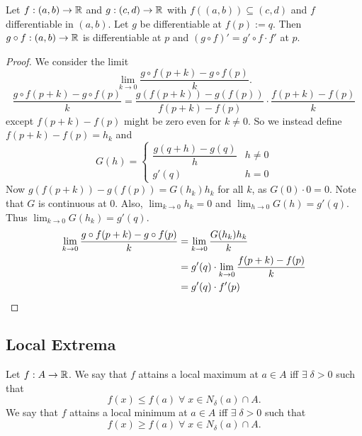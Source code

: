 
\begin{thm} \label{thm:diff:chain_rule}
    Let $f: (a, b) \to \mathbb{R}$ and $g : (c, d) \to \mathbb{R}$ with $f((a, b)) \subseteq (c, d)$ and $f$ differentiable in $(a, b)$. Let $g$ be differentiable at $f(p) := q$. Then $g \circ f : (a, b) \to \mathbb{R}$ is differentiable at $p$ and $(g \circ f)' = g' \circ f \cdot f'$ at $p$.
\end{thm}

\begin{proof}
    We consider the limit \[
        \lim_{k \to 0} \frac{g \circ f (p + k) - g \circ f (p)}{k}.
    \] \[
        \frac{g \circ f (p + k) - g \circ f (p)}{k} = \frac{g(f(p + k)) - g(f(p))}{f(p + k) - f(p)} \cdot \frac{f(p + k) - f(p)}{k}
    \] except $f(p + k) - f(p)$ might be zero even for $k \neq 0$. So we instead define $f(p + k) - f(p) = h_{k}$ and \[
        G(h) =
        \begin{cases}
            \dfrac{g(q + h) - g(q)}{h} & h \neq 0 \\
            g'(q) & h = 0
        \end{cases}
    \]
    Now $g(f(p + k)) - g(f(p)) = G(h_{k}) h_{k}$ for all $k$, as $G(0) \cdot 0 = 0$. Note that $G$ is continuous at $0$. Also, $\lim_{k \to 0} h_{k} = 0$ and $\lim_{h \to 0} G(h) = g'(q)$. Thus $\lim_{k \to 0} G(h_{k}) = g'(q)$.
    \begin{align*}
        \lim_{k \to 0} \frac{g \circ f (p + k) - g \circ f (p)}{k} &= \lim_{k \to 0} \frac{G(h_{k}) h_{k}}{k} \\
        &= g'(q) \cdot \lim_{k \to 0} \frac{f(p + k) - f(p)}{k} \\
        &= g'(q) \cdot f'(p) \qedhere
    \end{align*}
\end{proof}

\subsection{Local Extrema}
\begin{defn} \label{defn:diff:local_extrema}
    Let $f : A \to \mathbb{R}$. We say that $f$ attains a local maximum at $a \in A$ iff $\exists\; \delta > 0$ such that \[
        f(x) \leq f(a) \;\forall\; x \in N_{\delta}(a) \cap A.
    \] We say that $f$ attains a local minimum at $a \in A$ iff $\exists\; \delta > 0$ such that \[
        f(x) \geq f(a) \;\forall\; x \in N_{\delta}(a) \cap A.
    \]
\end{defn}

